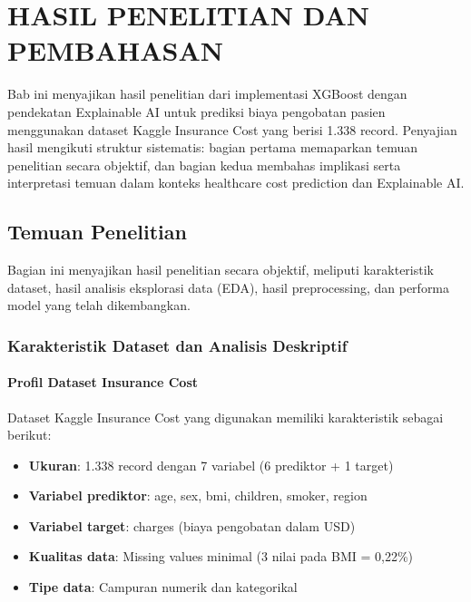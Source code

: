 \chapter{HASIL PENELITIAN DAN PEMBAHASAN}
\label{chap:hasil}

Bab ini menyajikan hasil penelitian dari implementasi XGBoost dengan pendekatan Explainable AI untuk prediksi biaya pengobatan pasien menggunakan dataset Kaggle Insurance Cost yang berisi 1.338 record. Penyajian hasil mengikuti struktur sistematis: bagian pertama memaparkan temuan penelitian secara objektif, dan bagian kedua membahas implikasi serta interpretasi temuan dalam konteks healthcare cost prediction dan Explainable AI.

\section{Temuan Penelitian}
\label{sec:temuan-penelitian}

Bagian ini menyajikan hasil penelitian secara objektif, meliputi karakteristik dataset, hasil analisis eksplorasi data (EDA), hasil preprocessing, dan performa model yang telah dikembangkan.

\subsection{Karakteristik Dataset dan Analisis Deskriptif}
\label{subsec:karakteristik-dataset}

\subsubsection{Profil Dataset Insurance Cost}

Dataset Kaggle Insurance Cost yang digunakan memiliki karakteristik sebagai berikut:

\begin{itemize}
    \item \textbf{Ukuran}: 1.338 record dengan 7 variabel (6 prediktor + 1 target)
    \item \textbf{Variabel prediktor}: age, sex, bmi, children, smoker, region
    \item \textbf{Variabel target}: charges (biaya pengobatan dalam USD)
    \item \textbf{Kualitas data}: Missing values minimal (3 nilai pada BMI = 0,22\%)
    \item \textbf{Tipe data}: Campuran numerik dan kategorikal
\end{itemize}

